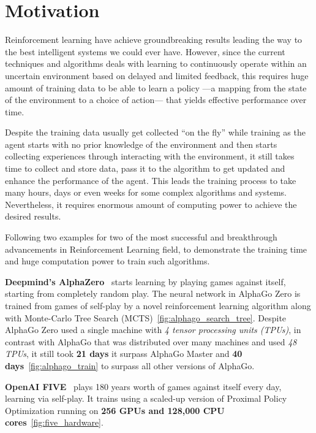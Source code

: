 \section{Motivation}

Reinforcement learning have achieve groundbreaking results leading the way to the best intelligent systems we could ever have.
However, since the current techniques and algorithms deals with learning to continuously operate within an uncertain environment based on delayed and limited feedback, this requires huge amount of training data to be able to learn a policy —a mapping from the state of the environment to a choice of action— that yields effective performance over time.

Despite the training data usually get collected ``on the fly'' while training as the agent starts with no prior knowledge of the environment and then starts collecting experiences through interacting with the environment, it still takes time to collect and store data, pass it to the algorithm to get updated and enhance the performance of the agent. This leads the training process to take many hours, days or even weeks for some complex algorithms and systems. Nevertheless, it requires enormous amount of computing power to achieve the desired results. 

Following two examples for two of the most successful and breakthrough advancements in Reinforcement Learning field, to demonstrate the training time and huge computation power to train such algorithms.

\textbf{Deepmind's AlphaZero}~\parencite{silver2017mastering} starts learning by playing games against itself, starting from completely random play. The neural network in AlphaGo Zero is trained from games of self-play by a novel reinforcement learning algorithm along with Monte-Carlo Tree Search (MCTS)~\ref{fig:alphago_search_tree}. 
Despite AlphaGo Zero used a single machine with \textit{4 tensor processing units (TPUs)}, in contrast with AlphaGo that was distributed over many machines and used \textit{48 TPUs}, it still took \textbf{21 days} it surpass AlphaGo Master and \textbf{40 days}~\ref{fig:alphago_train} to surpass all other versions of AlphaGo.

\textbf{OpenAI FIVE}~\parencite{OpenAI_dota} plays 180 years worth of games against itself every day, learning via self-play. It trains using a scaled-up version of Proximal Policy Optimization running on \textbf{256 GPUs and 128,000 CPU cores}~\ref{fig:five_hardware}.


